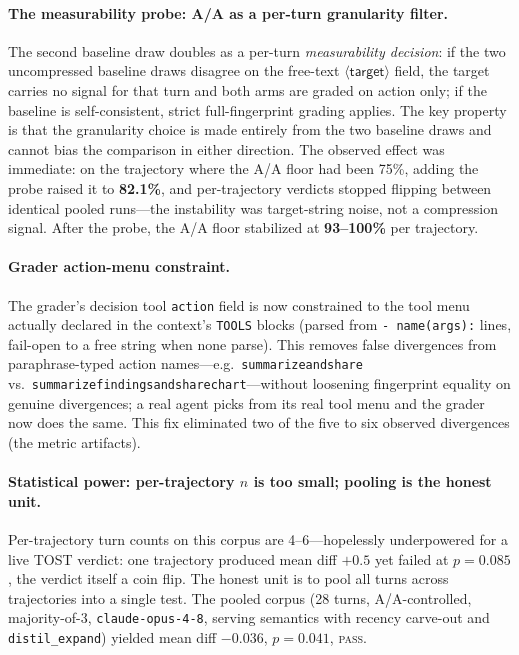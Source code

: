 \documentclass{article}
\begin{document}
\paragraph{The measurability probe: A/A as a per-turn granularity filter.}
The second baseline draw doubles as a per-turn \emph{measurability decision}: if the two
uncompressed baseline draws disagree on the free-text $\langle\textsf{target}\rangle$ field,
the target carries no signal for that turn and both arms are graded on \textsf{action} only;
if the baseline is self-consistent, strict full-fingerprint grading applies. The key property
is that the granularity choice is made entirely from the two baseline draws and cannot bias
the comparison in either direction. The observed effect was immediate: on the trajectory where
the A/A floor had been 75\%, adding the probe raised it to \textbf{82.1\%}, and per-trajectory
verdicts stopped flipping between identical pooled runs---the instability was target-string
noise, not a compression signal. After the probe, the A/A floor stabilized at
\textbf{93--100\%} per trajectory.

\paragraph{Grader action-menu constraint.}
The grader's decision tool \texttt{action} field is now constrained to the tool menu actually
declared in the context's \texttt{TOOLS} blocks (parsed from \texttt{-~name(args):} lines,
fail-open to a free string when none parse). This removes false divergences from
paraphrase-typed action names---e.g.\ \texttt{summarizeandshare}
vs.\ \texttt{summarizefindingsandsharechart}---without loosening fingerprint equality on
genuine divergences; a real agent picks from its real tool menu and the grader now does the
same. This fix eliminated two of the five to six observed divergences (the metric artifacts).

\paragraph{Statistical power: per-trajectory $n$ is too small; pooling is the honest unit.}
Per-trajectory turn counts on this corpus are 4--6---hopelessly underpowered for a live TOST
verdict: one trajectory produced mean diff $+0.5$ yet failed at $p=0.085$, the verdict itself
a coin flip. The honest unit is to pool all turns across trajectories into a single test. The
pooled corpus (28 turns, A/A-controlled, majority-of-3, \texttt{claude-opus-4-8}, serving
semantics with recency carve-out and \texttt{distil\_expand}) yielded mean diff $-0.036$,
$p=0.041$, \textsc{pass}.
\end{document}
